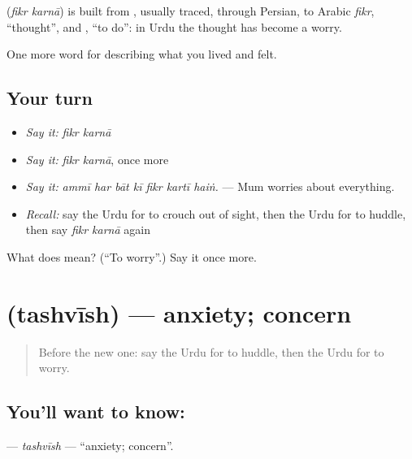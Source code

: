 \begin{cousinweb}
\textbf{ } (\emph{fikr karnā}) is built from \textbf{}, usually traced, through Persian, to Arabic \emph{fikr}, \textquotedblleft{}thought\textquotedblright{}, and \textbf{}, \textquotedblleft{}to do\textquotedblright{}: in Urdu the thought has become a worry.
\end{cousinweb}

\begin{grammarlens}[title={What you've built}]
One more word for describing what you lived and felt.
\end{grammarlens}

\subsection*{Your turn}
\begin{itemize}
\raggedright
  \item \emph{Say it:} \emph{fikr karnā}
  \item \emph{Say it:} \emph{fikr karnā}, once more
  \item \emph{Say it:} \emph{ammī har bāt kī fikr kartī haiṅ.} — Mum worries about everything.
  \item \emph{Recall:} say the Urdu for to crouch out of sight, then the Urdu for to huddle, then say \emph{fikr karnā} again
\end{itemize}

\begin{tcolorbox}[breakable,colback=teal!4,colframe=teal!35!black,title={Before you move on}]
What does   mean? (\textquotedblleft{}To worry\textquotedblright{}.) Say it once more.
\end{tcolorbox}
\section[\texorpdfstring{\ur{تشویش} (tashvīsh)}{تشویش (tashvīsh)}]{ (tashvīsh) — anxiety; concern}

\label{lesson:UR-C446-tashvish}



\begin{quote}
Before the new one: say the Urdu for to huddle, then the Urdu for to worry.
\end{quote}

\subsection*{You'll want to know: }
\textbf{} — \emph{tashvīsh} — \textquotedblleft{}anxiety; concern\textquotedblright{}.

